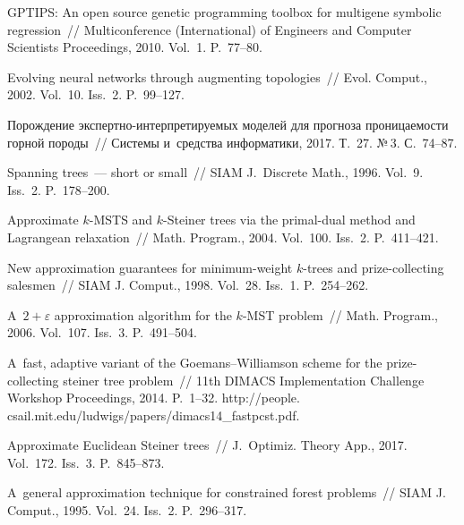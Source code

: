 \begin{multicols}{2}
{{\begin{thebibliography}{99}
 GPTIPS: An open source 
genetic programming toolbox for multigene  symbolic regression~// 
Multiconference (International) of Engineers and Computer Scientists Proceedings, 
2010. Vol.~1. P.~77--80.

 Evolving neural networks through 
augmenting topologies~// Evol. Comput., 2002. Vol.~10. 
Iss.~2. P.~99--127.

 По\-рож\-де\-ние экс\-перт\-но-ин\-тер\-пре\-ти\-ру\-емых 
моделей для прогноза проницаемости горной породы~// Системы и~средства информатики, 2017. Т.~27. №\,3. С.~74--87.
%

Spanning trees~--- short or small~// SIAM J.~Discrete Math., 
1996. Vol.~9. Iss.~2. P.~178--200.

 Approximate $k$-MSTS 
and $k$-Steiner trees via the primal-dual method and Lagrangean 
relaxation~// Math. Program., 2004. Vol.~100. Iss.~2. P.~411--421.

 New approximation guarantees 
for minimum-weight $k$-trees and prize-collecting salesmen~// SIAM J. 
Comput., 1998. Vol.~28. Iss.~1. P.~254--262.

 A~$2+\varepsilon$ approximation algorithm for the 
$k$-MST problem~// Math. Program., 2006. Vol.~107. 
Iss.~3. P.~491--504.

 A~fast, adaptive variant of the 
Goemans--Williamson scheme for the prize-collecting steiner tree problem~// 11th DIMACS Implementation Challenge Workshop Proceedings, 2014. P.~1--32.
{\sf http://people. csail.mit.edu/ludwigs/papers/dimacs14\_fastpcst.pdf}.

 Approximate Euclidean Steiner 
trees~// J.~Optimiz. Theory App., 2017. Vol.~172. 
Iss.~3. P.~845--873.

 A~general approximation technique for 
constrained forest problems~// SIAM J. Comput., 1995. Vol.~24. 
Iss.~2. P.~296--317.
\end{thebibliography}

 }
 }

\end{multicols}

